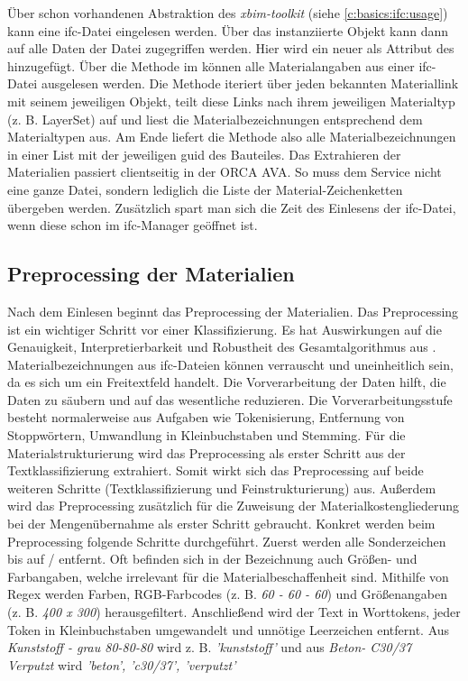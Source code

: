 Über schon vorhandenen Abstraktion des \textit{xbim-toolkit} (siehe \autoref{c:basics:ifc:usage}) kann eine \ac{ifc}-Datei eingelesen werden. Über das instanziierte Objekt  kann dann auf alle Daten der Datei zugegriffen werden. Hier wird ein neuer  als Attribut des  hinzugefügt. Über die Methode  im  können alle Materialangaben aus einer \ac{ifc}-Datei ausgelesen werden. Die Methode iteriert über jeden bekannten Materiallink mit seinem jeweiligen Objekt, teilt diese Links nach ihrem jeweiligen Materialtyp (z. B. LayerSet) auf und liest die Materialbezeichnungen entsprechend dem Materialtypen aus. Am Ende liefert die Methode also alle Materialbezeichnungen in einer List mit der jeweiligen \ac{guid} des Bauteiles.
Das Extrahieren der Materialien passiert clientseitig in der ORCA AVA. So muss dem Service nicht eine ganze Datei, sondern lediglich die Liste der Material-Zeichenketten übergeben werden. Zusätzlich spart man sich die Zeit des Einlesens der \ac{ifc}-Datei, wenn diese schon im \ac{ifc}-Manager geöffnet ist.

\subsection{Preprocessing der Materialien}
\label{c:conception:architecture:preprocessing}
Nach dem Einlesen beginnt das Preprocessing der Materialien.
Das Preprocessing ist ein wichtiger Schritt vor einer Klassifizierung. Es hat Auswirkungen auf die Genauigkeit, Interpretierbarkeit und Robustheit des Gesamtalgorithmus aus \citep[vgl.][]{Zelaya_2019}. Materialbezeichnungen aus \ac{ifc}-Dateien können verrauscht und uneinheitlich sein, da es sich um ein Freitextfeld handelt. Die Vorverarbeitung der Daten hilft, die Daten zu säubern und auf das wesentliche reduzieren. \citep[vgl.][]{Priyanga_2016}
Die Vorverarbeitungsstufe besteht normalerweise aus Aufgaben wie Tokenisierung, Entfernung von Stoppwörtern, Umwandlung in Kleinbuchstaben und Stemming. \citep[vgl.][]{Uysal_2014}
Für die Materialstrukturierung wird das Preprocessing als erster Schritt aus der Textklassifizierung extrahiert. Somit wirkt sich das Preprocessing auf beide weiteren Schritte (Textklassifizierung und Feinstrukturierung) aus. Außerdem wird das Preprocessing zusätzlich für die Zuweisung der Materialkostengliederung bei der Mengenübernahme als erster Schritt gebraucht.
Konkret werden beim Preprocessing folgende Schritte durchgeführt. Zuerst werden alle Sonderzeichen bis auf \glqq /\grqq{} entfernt. Oft befinden sich in der Bezeichnung auch Größen- und Farbangaben, welche irrelevant für die Materialbeschaffenheit sind.
Mithilfe von Regex werden Farben, RGB-Farbcodes (z. B. \textit{60 - 60 - 60}) und Größenangaben (z. B. \textit{400 x 300}) herausgefiltert. Anschließend wird der Text in Worttokens, jeder Token in Kleinbuchstaben umgewandelt und unnötige Leerzeichen entfernt. Aus \textit{\glqq Kunststoff - grau 80-80-80\grqq{}} wird z. B. \textit{\glqq 'kunststoff'\grqq{}} und aus \textit{\glqq Beton- C30/37 Verputzt\grqq{}} wird \textit{\glqq 'beton', 'c30/37', 'verputzt'\grqq{}}

